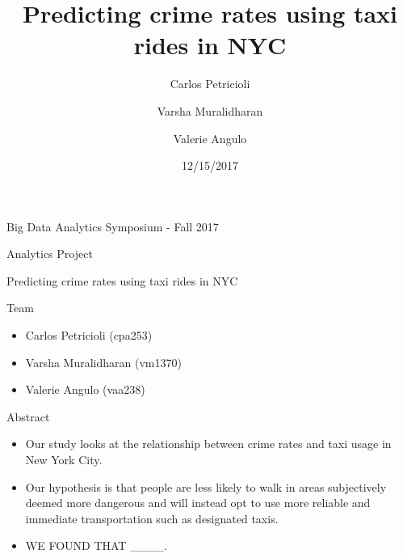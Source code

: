 \documentclass[10pt,ignorenonframetext,]{beamer}
\author{Carlos Petricioli \and
    Varsha Muralidharan   \and
    Valerie Angulo  }
\institute[New York University]{ New York University \\ \{cpa253,vm1370,vaa238\}@nyu.edu }
\title{Predicting crime rates using taxi rides in NYC}
\date{12/15/2017}
\providecommand{\tightlist}{%
  \setlength{\itemsep}{0pt}\setlength{\parskip}{0pt}}
\begin{document}
\frame{\titlepage}

\begin{frame}{%
\protect\hypertarget{big-data-analytics-symposium---fall-2017}{%
Big Data Analytics Symposium - Fall 2017}}

\begin{block}{Analytics Project}

Predicting crime rates using taxi rides in NYC

\end{block}

\begin{block}{Team}

\begin{itemize}
\item
  Carlos Petricioli (cpa253)
\item
  Varsha Muralidharan (vm1370)
\item
  Valerie Angulo (vaa238)
\end{itemize}

\end{block}

\begin{block}{Abstract}

\begin{itemize}
\tightlist
\item
  Our study looks at the relationship between crime rates and taxi usage
  in New York City.
\item
  Our hypothesis is that people are less likely to walk in areas
  subjectively deemed more dangerous and will instead opt to use more
  reliable and immediate transportation such as designated taxis.
\item
  WE FOUND THAT \_\_\_\_.
\end{itemize}

\end{block}

\end{frame}
\end{document}
